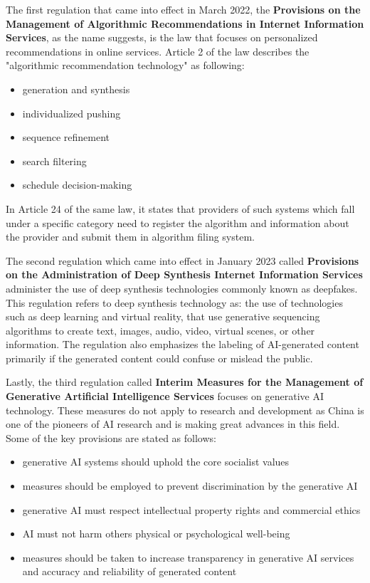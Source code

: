 The first regulation that came into effect in March 2022, the \textbf{Provisions on the Management of Algorithmic Recommendations in Internet Information Services}\cite{ProvisionsAlgorithmicRecommendations2022}\cite{CACAlgorithmicRecommendations2022}, as the name suggests, is the law that focuses on personalized recommendations in online services. Article 2 of the law describes the "algorithmic recommendation technology" as following:
\begin{itemize}
    \item generation and synthesis
    \item individualized pushing
    \item sequence refinement
    \item search filtering
    \item schedule decision-making
\end{itemize}
In Article 24 of the same law, it states that providers of such systems which fall under a specific category need to register the algorithm and information about the provider and submit them in algorithm filing system.

The second regulation which came into effect in January 2023 called \textbf{Provisions on the Administration of Deep Synthesis Internet Information Services}\cite{ProvisionsDeepSynthesis2022}\cite{CACDeepSynthesisRegulations2023} administer the use of deep synthesis technologies commonly known as deepfakes. This regulation refers to deep synthesis technology as: the use of technologies such as deep learning and virtual reality, that use generative sequencing algorithms to create text, images, audio, video, virtual scenes, or other information. The regulation also emphasizes the labeling of AI-generated content primarily if the generated content could confuse or mislead the public.

Lastly, the third regulation called \textbf{Interim Measures for the Management of Generative Artificial Intelligence Services}\cite{InterimMeasuresGenerativeAI2023}\cite{CACGenerativeAIInterim2023} focuses on generative AI technology. These measures do not apply to research and development as China is one of the pioneers of AI research and is making great advances in this field. Some of the key provisions are stated as follows:
\begin{itemize}
    \item generative AI systems should uphold the core socialist values
    \item measures should be employed to prevent discrimination by the generative AI
    \item generative AI must respect intellectual property rights and commercial ethics
    \item AI must not harm others physical or psychological well-being
    \item measures should be taken to increase transparency in generative AI services and accuracy and reliability of generated content
\end{itemize}

